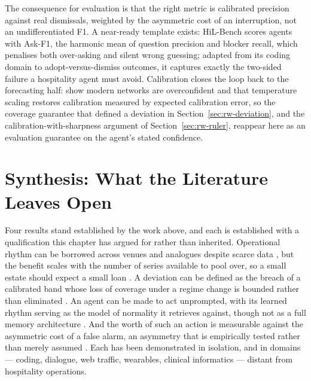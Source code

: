 The consequence for evaluation is that the right metric is calibrated precision
against real dismissals, weighted by the asymmetric cost of an interruption,
not an undifferentiated F1. A near-ready template exists: HiL-Bench
\citep{trinh_hil-bench_2026} scores agents with Ask-F1, the harmonic mean of
question precision and blocker recall, which penalises both over-asking and
silent wrong guessing; adapted from its coding domain to adopt-versus-dismiss
outcomes, it captures exactly the two-sided failure a hospitality agent must
avoid. Calibration closes the loop back to the forecasting half:
\citet{guo_calibration_2017} show modern networks are overconfident and that
temperature scaling restores calibration measured by expected calibration
error, so the coverage guarantee that defined a deviation in
Section~\ref{sec:rw-deviation}, and the calibration-with-sharpness argument of
Section~\ref{sec:rw-ruler}, reappear here as an evaluation guarantee on the
agent's stated confidence.

\section{Synthesis: What the Literature Leaves Open}
\label{sec:rw-synthesis}

Four results stand established by the work above, and each is established with
a qualification this chapter has argued for rather than inherited. Operational
rhythm can be borrowed across venues and analogues despite scarce data
\citep{das_-context_2025,zhou_context-driven_2025,liu_generative_2024}, but the
benefit scales with the number of series available to pool over, so a small
estate should expect a small loan \citep{montero-manso_principles_2021}. A
deviation can be defined as the breach of a calibrated band whose loss of
coverage under a regime change is bounded rather than eliminated
\citep{sun_conformal_2025,barber_conformal_2023,liu_elephant_2024}. An agent
can be made to act unprompted, with its learned rhythm serving as the model of
normality it retrieves against, though not as a full memory architecture
\citep{lu_proactive_2024,hu_memory_2026,park_generative_2023}. And the worth of
such an action is measurable against the asymmetric cost of a false alarm, an
asymmetry that is empirically tested rather than merely assumed
\citep{meyer_conceptual_2004,dixon_independence_2007,ancker_effects_2017,fu_prism_2026,trinh_hil-bench_2026}.
Each has been demonstrated in isolation, and in domains --- coding, dialogue,
web traffic, wearables, clinical informatics --- distant from hospitality
operations.

